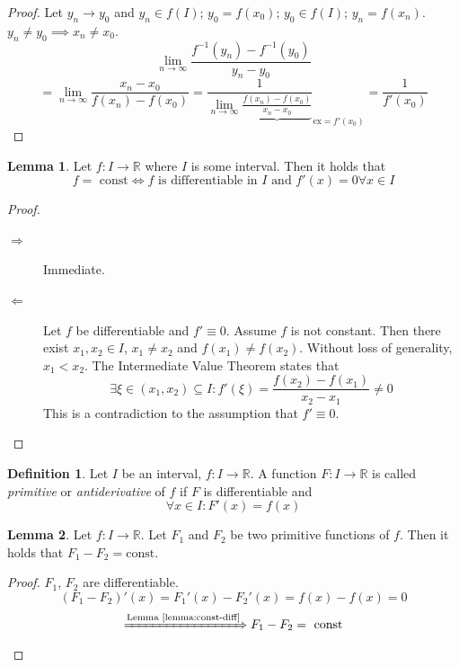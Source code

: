 \documentclass[a4paper,landscape,twocolumn]{article}
\theoremstyle{definition}
\newtheorem{defi}{Definition}
\newtheorem{lemma}{Lemma}
\begin{document}
\begin{proof}
  Let $y_n \to y_0$ and $y_n \in f(I)$; $y_0 = f(x_0)$; $y_0 \in f(I)$; $y_n = f(x_n)$.
  $y_n \neq y_0 \implies x_n \neq x_0$.
  \[ \lim_{n\to\infty} \frac{f^{-1}(y_n) - f^{-1}(y_0)}{y_n - y_0} \]
  \[
    = \lim_{n\to\infty} \frac{x_n - x_0}{f(x_n) - f(x_0)}
    = \frac{1}{\lim_{n\to\infty} \underbrace{\frac{f(x_n) - f(x_0)}{x_n - x_0}}}_{\text{ex} = f'(x_0)} = \frac{1}{f'(x_0)}
  \]
\end{proof}

\begin{lemma}
  \label{lemma:const-diff}
  Let $f: I \to \mathbb R$ where $I$ is some interval. Then it holds that
  \[ f = \text{ const} \Leftrightarrow f \text{ is differentiable in $I$ and } f'(x) = 0 \forall x \in I \]
\end{lemma}
\begin{proof}
  \begin{description}
    \item[$\Rightarrow$]
      Immediate.
    \item[$\Leftarrow$]
      Let $f$ be differentiable and $f' \equiv 0$.
      Assume $f$ is not constant. Then there exist $x_1, x_2 \in I$, $x_1 \neq x_2$
      and $f(x_1) \neq f(x_2)$. Without loss of generality, $x_1 < x_2$.
      The Intermediate Value Theorem states that
      \[ \exists \xi \in (x_1, x_2) \subseteq I: f'(\xi) = \frac{f(x_2) - f(x_1)}{x_2 - x_1} \neq 0 \]
      This is a contradiction to the assumption that $f' \equiv 0$.
  \end{description}
\end{proof}

\begin{defi}
  Let $I$ be an interval, $f: I \to \mathbb R$.
  A function $F: I \to \mathbb R$ is called \emph{primitive} or \emph{antiderivative} of $f$
  if $F$ is differentiable and
  \[ \forall x \in I: F'(x) = f(x) \]
\end{defi}
\begin{lemma}
  Let $f: I \to \mathbb R$. Let $F_1$ and $F_2$ be two primitive functions of $f$.
  Then it holds that $F_1 - F_2 = \text{const}$.
\end{lemma}
\begin{proof}
  $F_1$, $F_2$ are differentiable.
  \[ (F_1 - F_2)'(x) = F_1'(x) - F_2'(x) = f(x) - f(x) = 0 \]
  \[ \xRightarrow{\text{Lemma~\ref{lemma:const-diff}}} F_1 - F_2 = \text{ const} \]
\end{proof}
\end{document}
